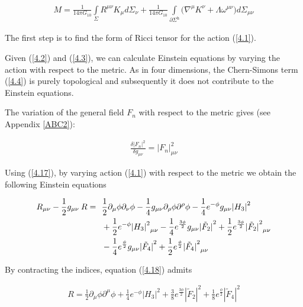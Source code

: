 \documentclass[a4paper,notitlepage]{report}
\begin{document}
\begin{align} \label{4.16}
M = \frac{1}{14\pi G_{10}} \int\limits_{\Sigma} R^{\mu\nu} K_{\mu} d\Sigma_{\nu} + \frac{1}{14\pi G_{10}}  \int\limits_{\partial \Sigma^{\text{h}}} \Big( \nabla^{\mu} K^{\nu} + \Lambda \omega^{\mu\nu} \Big) d\Sigma_{\mu\nu}\end{align}

\vspace{0.5em}
The first step is to find the form of Ricci tensor for the action (\ref{4.1}).

Given (\ref{4.2}) and (\ref{4.3}), we can calculate Einstein equations by varying the action with respect to the metric. As in four dimensions, the Chern-Simons term (\ref{4.4}) is purely topological and subsequently it does not contribute to the Einstein equations.

The variation of the general field ${F}_{n}$ with respect to the metric gives (see Appendix  \ref{ABC2}): 

\begin{align} \label{4.17}
\frac{\delta {|{F}_{n}|}^2}{\delta g_{\mu \nu}} = {|{F}_{n}|}^2_{\mu\nu} 
\end{align}

\vspace{0.5em}
Using (\ref{4.17}), by varying action (\ref{4.1}) with respect to the metric we obtain the following Einstein equations

\begin{align} \label{4.18}
R_{\mu\nu} - \frac{1}{2} g_{\mu\nu} \: R = \:\:\: & \frac{1}{2} \partial_{\mu} \phi \partial_{\nu} \phi - \frac{1}{4} g_{\mu\nu} \partial_{\rho} \phi \partial^{\rho} \phi - \frac{1}{4} e^{-\phi} g_{\mu\nu} {|H_{3}|}^2 \notag \\
&+ \frac{1}{2} e^{-\phi} {{|H_{3}|}^2}_{\mu\nu} - \frac{1}{4} e^{\frac{3\phi}{2}} g_{\mu\nu} {|\tilde{F}_{2}|}^2 + \frac{1}{2} e^{\frac{3\phi}{2}} {{|\tilde{F}_{2}|}^2}_{\mu\nu} \notag \\
&- \frac{1}{4} e^{\frac{\phi}{2}} g_{\mu\nu} {|\tilde{F}_{4}|}^2 + \frac{1}{2} e^{\frac{\phi}{2}} {{|\tilde{F}_{4}|}^2}_{\mu\nu}
\end{align}

\vspace{0.5em}
By contracting the indices, equation (\ref{4.18}) admits

\begin{align} \label{4.19}
R = \frac{1}{2} \partial_{\mu} \phi \partial^{\mu} \phi + \frac{1}{4}e^{-\phi} {|H_{3}|}^2 + \frac{3}{8} e^{\frac{3\phi}{2}} {|\tilde{F}_{2}|}^2 + \frac{1}{8} e^{\frac{\phi}{2}} {{|\tilde{F}_{4}|}^2}
\end{align}
\end{document}
